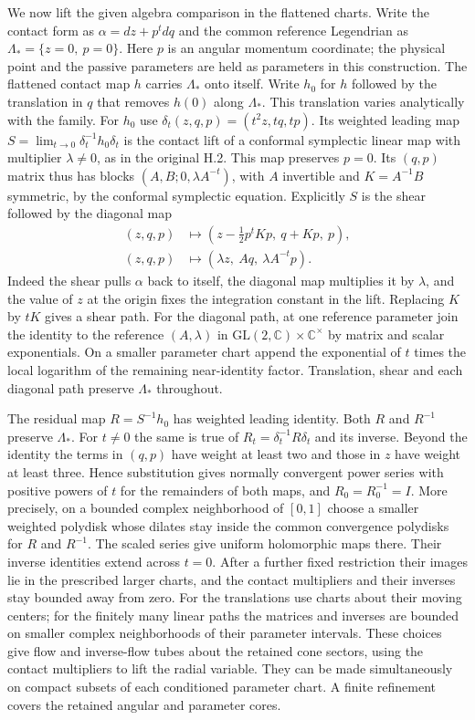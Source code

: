 \documentclass[
  english,
  11pt,
  reqno]{amsart}
\begin{document}
We now lift the given algebra comparison in the flattened charts. Write
the contact form as \(\alpha=dz+p^t dq\) and the common reference
Legendrian as \(\Lambda_*=\{z=0,\ p=0\}\). Here \(p\) is an angular
momentum coordinate; the physical point and the passive parameters are
held as parameters in this construction. The flattened contact map \(h\)
carries \(\Lambda_*\) onto itself. Write \(h_0\) for \(h\) followed by
the translation in \(q\) that removes \(h(0)\) along \(\Lambda_*\). This
translation varies analytically with the family. For \(h_0\) use
\(\delta_t(z,q,p)=(t^2z,tq,tp)\). Its weighted leading map
\(S=\lim_{t\to0}\delta_t^{-1}h_0\delta_t\) is the contact lift of a
conformal symplectic linear map with multiplier \(\lambda\ne0\), as in
the original H.2. This map preserves \(p=0\). Its \((q,p)\) matrix thus
has blocks \((A,B;0,\lambda A^{-t})\), with \(A\) invertible and
\(K=A^{-1}B\) symmetric, by the conformal symplectic equation.
Explicitly \(S\) is the shear followed by the diagonal map \[
\begin{aligned}
(z,q,p)&\longmapsto(z-\tfrac12 p^t Kp,\ q+Kp,\ p),\\
(z,q,p)&\longmapsto(\lambda z,\ Aq,\ \lambda A^{-t}p).
\end{aligned}
\] Indeed the shear pulls \(\alpha\) back to itself, the diagonal map
multiplies it by \(\lambda\), and the value of \(z\) at the origin fixes
the integration constant in the lift. Replacing \(K\) by \(tK\) gives a
shear path. For the diagonal path, at one reference parameter join the
identity to the reference \((A,\lambda)\) in
\(\mathrm{GL}(2,\mathbb C)\times\mathbb C^\times\) by matrix and scalar
exponentials. On a smaller parameter chart append the exponential of
\(t\) times the local logarithm of the remaining near-identity factor.
Translation, shear and each diagonal path preserve \(\Lambda_*\)
throughout.

The residual map \(R=S^{-1}h_0\) has weighted leading identity. Both
\(R\) and \(R^{-1}\) preserve \(\Lambda_*\). For \(t\ne0\) the same is
true of \(R_t=\delta_t^{-1}R\delta_t\) and its inverse. Beyond the
identity the terms in \((q,p)\) have weight at least two and those in
\(z\) have weight at least three. Hence substitution gives normally
convergent power series with positive powers of \(t\) for the remainders
of both maps, and \(R_0=R_0^{-1}=I\). More precisely, on a bounded
complex neighborhood of \([0,1]\) choose a smaller weighted polydisk
whose dilates stay inside the common convergence polydisks for \(R\) and
\(R^{-1}\). The scaled series give uniform holomorphic maps there. Their
inverse identities extend across \(t=0\). After a further fixed
restriction their images lie in the prescribed larger charts, and the
contact multipliers and their inverses stay bounded away from zero. For
the translations use charts about their moving centers; for the finitely
many linear paths the matrices and inverses are bounded on smaller
complex neighborhoods of their parameter intervals. These choices give
flow and inverse-flow tubes about the retained cone sectors, using the
contact multipliers to lift the radial variable. They can be made
simultaneously on compact subsets of each conditioned parameter chart. A
finite refinement covers the retained angular and parameter cores.
\end{document}
